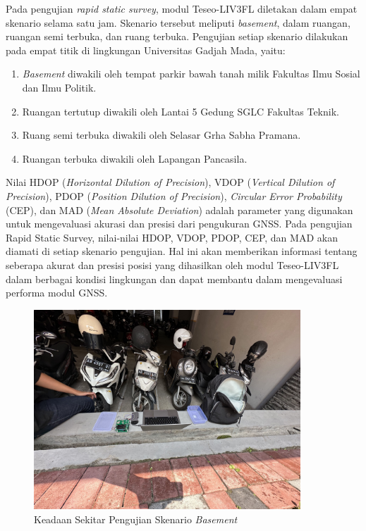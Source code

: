 Pada pengujian \textit{rapid static survey}, modul Teseo\hyp{}LIV3FL diletakan dalam empat skenario selama satu jam. Skenario tersebut meliputi \textit{basement}, dalam ruangan, ruangan semi terbuka, dan ruang terbuka. Pengujian setiap skenario dilakukan pada empat titik di lingkungan Universitas Gadjah Mada, yaitu:

\begin{enumerate}
	\item \textit{Basement} diwakili oleh tempat parkir bawah tanah milik Fakultas Ilmu Sosial dan Ilmu Politik.
	\item Ruangan tertutup diwakili oleh Lantai 5 Gedung SGLC Fakultas Teknik.
	\item Ruang semi terbuka diwakili oleh Selasar Grha Sabha Pramana.
	\item Ruangan terbuka diwakili oleh Lapangan Pancasila.
\end{enumerate}

Nilai HDOP (\textit{Horizontal Dilution of Precision}), VDOP (\textit{Vertical Dilution of Precision}), PDOP (\textit{Position Dilution of Precision}), \textit{Circular Error Probability} (CEP), dan MAD (\textit{Mean Absolute Deviation}) adalah parameter yang digunakan untuk mengevaluasi akurasi dan presisi dari pengukuran GNSS. Pada pengujian Rapid Static Survey, nilai-nilai HDOP, VDOP, PDOP, CEP, dan MAD akan diamati di setiap skenario pengujian. Hal ini akan memberikan informasi tentang seberapa akurat dan presisi posisi yang dihasilkan oleh modul Teseo\hyp{}LIV3FL dalam berbagai kondisi lingkungan dan dapat membantu dalam mengevaluasi performa modul GNSS.

\begin{figure}[H]
	\centering
	\includegraphics[width=10cm]{contents/chapter-4/1-skenario-basement/keadaan.jpg}
	\caption{Keadaan Sekitar Pengujian Skenario \textit{Basement}}
	\label{Fig: basement-keadaan}
\end{figure}


